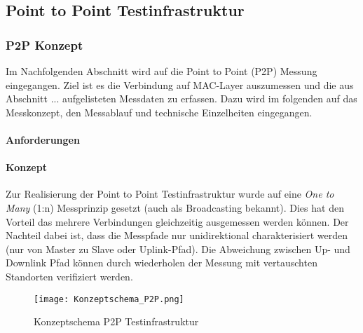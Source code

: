 \vspace*{4cm}
\begin{center}
\part{Point to Point Testinfrastruktur}\label{PointtoPointTestinfrastruktur}
\end{center}
\vspace*{\fill}
\clearpage

\section{P2P Konzept}\label{sec:P2PKonzept}

Im Nachfolgenden Abschnitt wird auf die Point to Point (P2P) Messung eingegangen. Ziel ist es die Verbindung auf MAC-Layer auszumessen und die aus Abschnitt ... aufgelisteten Messdaten zu erfassen. Dazu wird im folgenden auf das Messkonzept, den Messablauf und technische Einzelheiten eingegangen. 

\subsection{Anforderungen}\label{sec:AnforderungentP2P}



\subsection{Konzept}\label{sec:KonzeptP2P}

Zur Realisierung der Point to Point Testinfrastruktur wurde auf eine \textit{One to Many} (1:n) Messprinzip gesetzt (auch als Broadcasting bekannt). Dies hat den Vorteil das mehrere Verbindungen gleichzeitig ausgemessen werden können. Der Nachteil dabei ist, dass die Messpfade nur unidirektional charakterisiert werden (nur von Master zu Slave oder Uplink-Pfad). Die Abweichung zwischen Up- und Downlink Pfad können durch wiederholen der Messung mit vertauschten Standorten verifiziert werden. 

\begin{figure} [H]
	\centering
	\texttt{[image: Konzeptschema\_P2P.png]}
	\caption{Konzeptschema P2P Testinfrastruktur}
	\label{fig:KonzeptschemaP2P}
\end{figure}

